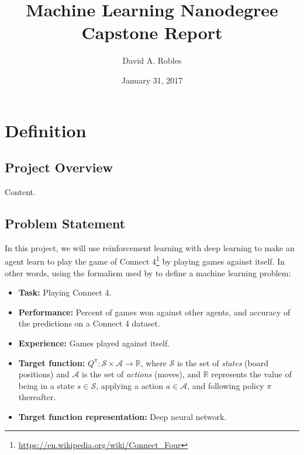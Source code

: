 \documentclass{article}
\title{Machine Learning Nanodegree \\ Capstone Report}
\author{David A. Robles}
\date{January 31, 2017}
\begin{document}
\maketitle

\section{Definition}

\subsection{Project Overview}

Content.

\subsection{Problem Statement}
\label{sec:problem-statement}

\newcommand{\URLcf}{https://en.wikipedia.org/wiki/Connect_Four}

In this project, we will use reinforcement learning with deep learning to make an agent learn to
play the game of {Connect 4}\footnote{\url{\URLcf}} by playing games against itself. In other words,
using the formalism used by \cite{Mitchell1997Book} to define a machine learning problem:

\begin{itemize}

    \item \textbf{Task:} Playing Connect 4.

    \item \textbf{Performance:} Percent of games won against other agents, and accuracy of the
        predictions on a Connect 4 dataset.

    \item \textbf{Experience:} Games played against itself.

    \item \textbf{Target function:} $Q^\pi : \mathcal{S} \times \mathcal{A} \to \mathbb{R}$, where
        $\mathcal{S}$ is the set of \emph{states} (board positions) and $\mathcal{A}$ is the set of
        \emph{actions} (moves), and $\mathbb{R}$ represents the value of being in a state $s \in
        \mathcal{S}$, applying a action $a \in \mathcal{A}$, and following policy $\pi$ thereafter.

    \item \textbf{Target function representation:} Deep neural network.

\end{itemize}
\end{document}
